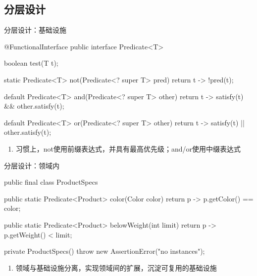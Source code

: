 \subsection{分层设计}

\begin{frame}[fragile]{分层设计：基础设施}
  \begin{java}
@FunctionalInterface
public interface Predicate<T> {
  boolean test(T t);

  static Predicate<T> not(Predicate<? super T> pred) {
    return t -> !pred(t);
  }

  default Predicate<T> and(Predicate<? super T> other) {
    return t -> satisfy(t) && other.satisfy(t);
  }

  default Predicate<T> or(Predicate<? super T> other) {
    return t -> satisfy(t) || other.satisfy(t);
  }
}
  \end{java}

\begin{enumerate}
  \item 习惯上，not使用前缀表达式，并具有最高优先级；and/or使用中缀表达式
\end{enumerate}   
\end{frame}

\begin{frame}[fragile]{分层设计：领域内}
  \begin{java}
public final class ProductSpecs {
  public static Predicate<Product> color(Color color) {
    return p -> p.getColor() == color;
  }

  public static Predicate<Product> belowWeight(int limit) {
    return p -> p.getWeight() < limit;
  }

  private ProductSpecs() {
    throw new AssertionError("no instances");
  }
}
  \end{java}

\begin{enumerate}
  \item 领域与基础设施分离，实现领域间的扩展，沉淀可复用的基础设施
\end{enumerate}
\end{frame}

